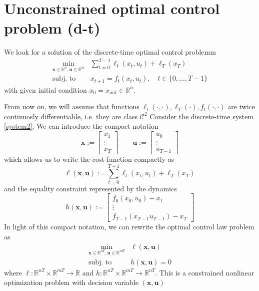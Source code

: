 \documentclass[openany]{book}
\newcommand{\R}{\mathbb{R}} %
\theoremstyle{definition}
\theoremstyle{remark}
\begin{document}
\section{Unconstrained optimal control problem (d-t)}
We look for a solution of the discrete-time optimal control problemm 
\begin{align*}
        \min_{\mathbf{x}\in\R^n,\mathbf{u}\in\R^m} & \displaystyle\sum_{t=0}^{T-1}\ell_t(x_t,u_t)+\ell_T(x_T)\\
        \text{subj. to } & x_{t+1} = f_t(x_t,u_t), \quad t\in\{0,\dots,T-1\} 
\end{align*}
with given initial condition $x_0 = x_{\text{init}}\in \R^n$. 

From now on, we will assume that functions $\ell_t(\cdot,\cdot),\ell_T(\cdot),f_t(\cdot,\cdot)$ are twice continuosly differentiable, i.e. they are class $\mathcal{C}^2$
Consider the discrete-time system \eqref{system2}. We can introduce the compact notation 
\[
    \mathbf{x} := \begin{bmatrix}
        x_1 \\ \vdots \\ x_T
    \end{bmatrix} \qquad \mathbf{u} := \begin{bmatrix}
        u_0 \\ \vdots \\ u_{T-1}
    \end{bmatrix}
\]
which allows us to write the cost function compactly as 
\[
    \ell({\mathbf{x},\mathbf{u}}) := \sum_{t=0}^{T-1}\ell_t(x_t,u_t)+\ell_T(x_T)
\]
and the equality constraint represented by the dynamics 
\[
    h(\mathbf{x},\mathbf{u}) := \begin{bmatrix}
        f_0(x_0,u_0)-x_1 \\ \vdots \\ f_{T-1}(x_{T-1}u_{T-1})-x_T
    \end{bmatrix}
\]
In light of this compact notation, we can rewrite the optimal control law problem as 
\begin{align*}
    \min_{\mathbf{x}\in\R^{nT},\mathbf{u}\in\R^{mT}} &\ell(\mathbf{x},\mathbf{u})\\
    \text{subj. to } & h(\mathbf{x},\mathbf{u})=0
\end{align*}
where $\ell:\R^{nT}\times\R^{mT}\to\R$ and $h:\R^{nT}\times\R^{mT}\to\R^{nT}$. This is a constrained nonlinear optimization problem with decision variable $(\mathbf{x},\mathbf{u})$
\end{document}
